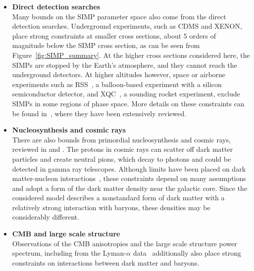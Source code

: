 \begin{itemize}
\item[] \textbf{Direct detection searches}\\
Many bounds on the \ac{SIMP} parameter space also come from the direct detection searches. Underground experiments, such as CDMS and XENON,
place strong constraints at smaller cross sections, about 5 orders of magnitude below the \ac{SIMP} cross section, as can be seen from Figure~\ref{fig:SIMP_summary}. At the higher cross sections considered here, the \acp{SIMP} are stopped by the Earth's atmosphere, and they cannot reach the underground detectors. At higher altitudes however, space or airborne experiments such as RSS~\cite{Rich:1987st}, a balloon-based experiment with a silicon semiconductor detector, and XQC~\cite{Erickcek:2007jv}, a sounding rocket experiment, exclude \acp{SIMP} in some regions of phase space. More details on these constraints can be found in~\cite{Mack:2007xj}, where they have been extensively reviewed.

\item[] \textbf{Nucleosynthesis and cosmic rays}\\
There are also bounds from primordial nucleosynthesis and cosmic rays, reviewed in \cite{Mack:2012ju} and \cite{Cyburt:2002uw}. The protons in cosmic rays can scatter off dark matter particles and create neutral pions, which decay to photons and could be detected in gamma ray telescopes. Although limits have been placed on dark matter-nucleon interactions~\cite{Cyburt:2002uw}, these constraints depend on many assumptions and adopt a form of the dark matter density near the galactic core. Since the considered model describes a nonstandard form of dark matter with a relatively strong interaction with baryons, these densities may be considerably different.

\item[] \textbf{\ac{CMB} and large scale structure}\\
Observations of the \ac{CMB} anisotropies and the large scale structure power spectrum, including from the Lyman-$\alpha$ data~\cite{Chen:2002yh,Dvorkin:2013cea} additionally also place strong constraints on interactions between dark matter and baryons.


\end{itemize}
